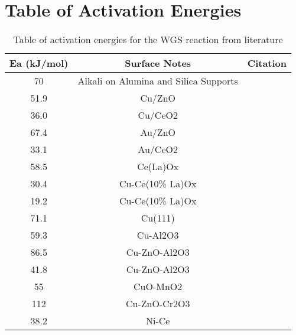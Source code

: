 \chapter*{Table of Activation Energies}
\begin{center}
\begin{longtable}{ccc}
\caption{Table of activation energies for the WGS reaction from literature}
\label{table: AppActivationEnergies} \\
\textbf{Ea (kJ/mol)} & \textbf{Surface Notes}                  & \textbf{Citation} \\ \hline
70                   & Alkali on Alumina and Silica Supports   & \cite{Herron_2010}         \\
51.9                 & Cu/ZnO                                  & \cite{Rodriguez_2007}         \\
36.0                 & Cu/CeO2                                 & \cite{Rodriguez_2007}         \\
67.4                 & Au/ZnO                                  & \cite{Rodriguez_2007}         \\
33.1                 & Au/CeO2                                 & \cite{Rodriguez_2007}         \\
58.5                 & Ce(La)Ox                                & \cite{Li_2000}         \\
30.4                 & Cu-Ce(10\% La)Ox                        & \cite{Li_2000}         \\
19.2                 & Cu-Ce(10\% La)Ox                        & \cite{Li_2000}         \\
71.1                 & Cu(111)                                 & \cite{Li_2000}         \\
59.3                 & Cu-Al2O3                                & \cite{Li_2000}         \\
86.5                 & Cu-ZnO-Al2O3                            & \cite{Li_2000}         \\
41.8                 & Cu-ZnO-Al2O3                            & \cite{Li_2000}         \\
55                   & CuO-MnO2                                & \cite{Li_2000}         \\
112                  & Cu-ZnO-Cr2O3                            & \cite{Li_2000}         \\
38.2                 & Ni-Ce                                   & \cite{Li_2000}         \\

\end{longtable}
\end{center}
